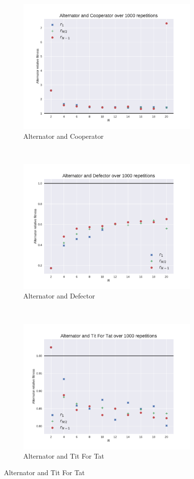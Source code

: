 \documentclass{article}
\begin{document}
\begin{figure}[!hbtp]
    \centering
    \begin{subfigure}[t]{.3\textwidth}
        \centering
        \includegraphics[width=.8\textwidth]{./img/Alternator_v_Cooperator_fitness.pdf}
        \caption{Alternator and Cooperator}
    \end{subfigure}%
    ~
    \begin{subfigure}[t]{.3\textwidth}
        \centering
        \includegraphics[width=.8\textwidth]{./img/Alternator_v_Defector_fitness.pdf}
        \caption{Alternator and Defector}
    \end{subfigure}%
    ~
    \begin{subfigure}[t]{.3\textwidth}
        \centering
        \includegraphics[width=.8\textwidth]{./img/Alternator_v_Tit_For_Tat_fitness.pdf}
        \caption{Alternator and Tit For Tat}
    \end{subfigure}%


\end{figure}
\end{document}
